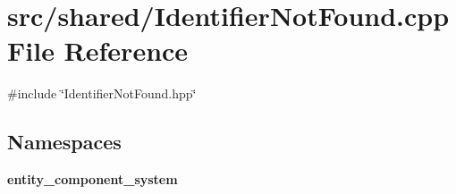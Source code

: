 \section{src/shared/\+Identifier\+Not\+Found.cpp File Reference}
\label{_identifier_not_found_8cpp}
{\ttfamily \#include \char`\"{}Identifier\+Not\+Found.\+hpp\char`\"{}}\newline
\subsection*{Namespaces}
\begin{DoxyCompactItemize}
\item 
 {\bf entity\+\_\+component\+\_\+system}
\end{DoxyCompactItemize}
